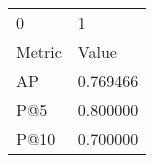 \begin{tabular}{ll}
0 & 1 \\
Metric & Value \\
AP & 0.769466 \\
P@5 & 0.800000 \\
P@10 & 0.700000 \\
\end{tabular}
